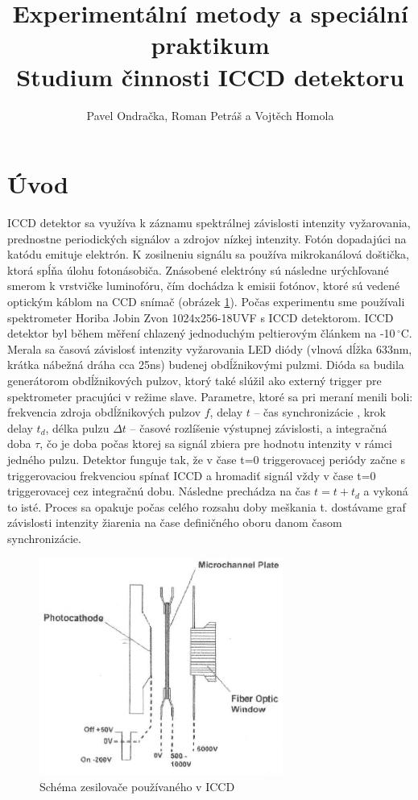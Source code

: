 \documentclass[12pt]{article}
\begin{document}
\title{Experimentální metody a speciální praktikum \\
Studium činnosti ICCD detektoru}
\author{Pavel Ondračka, Roman Petráš a Vojtěch Homola}
\maketitle

\section{Úvod}
ICCD detektor sa využíva k záznamu spektrálnej závislosti intenzity vyžarovania, prednostne periodických signálov a zdrojov nízkej intenzity.
Fotón dopadajúci na katódu emituje elektrón. K zosilneniu signálu sa používa mikrokanálová doštička, ktorá spĺňa úlohu fotonásobiča. Znásobené elektróny sú následne urýchľované smerom k vrstvičke luminofóru, čím dochádza k emisii fotónov, ktoré sú vedené optickým káblom na CCD snímač (obrázek \ref{}).
Počas experimentu sme používali spektrometer Horiba Jobin Zvon 1024x256-18UVF s ICCD detektorom. ICCD detektor byl během měření chlazený jednoduchým peltierovým článkem na -10\,$^\circ$C.
Merala sa časová závislosť intenzity vyžarovania LED diódy (vlnová dĺžka 633nm, krátka nábežná dráha cca 25ns) budenej obdĺžnikovými pulzmi. Dióda sa budila generátorom obdĺžnikových pulzov, ktorý také slúžil ako externý trigger pre spektrometer pracujúci v režime slave.
Parametre, ktoré sa pri meraní menili boli: frekvencia zdroja obdĺžnikových pulzov $f$, delay $t$ -- čas synchronizácie , krok delay $t_d$, délka pulzu $\Delta t$ – časové rozlíšenie výstupnej závislosti, a integračná doba $\tau$, čo je doba počas ktorej sa signál zbiera pre hodnotu intenzity v rámci jedného pulzu.
Detektor funguje tak, že v čase t=0 triggerovacej periódy začne s triggerovaciou frekvenciou spínať ICCD a hromadiť signál vždy v čase t=0 triggerovacej cez integračnú dobu. Následne prechádza na čas $t = t + t_d$  a vykoná to isté. Proces sa opakuje počas celého rozsahu doby meškania t. dostávame graf závislosti intenzity žiarenia na čase definičného oboru danom časom synchronizácie.


\begin{figure}[htbp]
\begin{center}
\includegraphics[width=8cm]{img1.png}
\caption{Schéma zesilovače používaného v ICCD}
\label{}
\end{center}
\end{figure}
\end{document}
